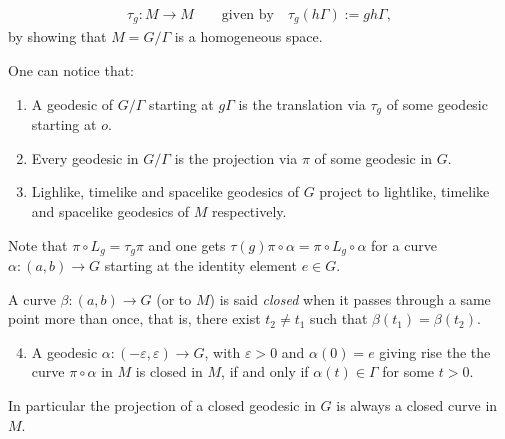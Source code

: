 \documentclass[11pt]{amsart}
\theoremstyle{plain}
\theoremstyle{definition}
\theoremstyle{remark}
\begin{document}
	\begin{eqnarray*}
		\tau_g : M \rightarrow M\qquad \mbox{given by} \quad 
		\tau_g(h\Gamma):=gh\Gamma,
	\end{eqnarray*}
	by  showing that $M=G/\Gamma$ is a homogeneous space. 
	
One can notice that: 
	
	\begin{enumerate}
		\item A geodesic of $G/\Gamma$ starting at $g\Gamma$ is the translation via $\tau_g$ of some geodesic starting at $o$. \label{punto1}
		\item Every geodesic in $G/\Gamma$ is the projection via $\pi$ of some geodesic in $G$.\label{punto2}
		\item Lighlike, timelike and spacelike geodesics of $G$ project to lightlike, timelike and spacelike geodesics of $M$ respectively.
	\end{enumerate}
	
	
	Note that $\pi \circ L_g = \tau_g \pi$ and one gets $\tau(g)\pi\circ \alpha=\pi\circ L_g \circ \alpha$ for a curve $\alpha:(a,b)\to G$ starting at the identity element  $e\in G$. 
	
	 A curve $\beta:(a,b)\to G$ (or to $M$) is said {\em closed } when it passes through a same point more than once, that is, there exist $t_2\neq  t_1$ such that $\beta(t_1)=\beta(t_2)$. %
	\begin{enumerate}
		\setcounter{enumi}{3}
		
		\item A geodesic $\alpha: (-\varepsilon, \varepsilon) \to G$, with $\varepsilon>0$ and   $\alpha(0)=e$   giving rise the the curve $\pi\circ \alpha$ in $M$  is closed in $M$, if and only if  $\alpha(t) \in \Gamma$ for some $t>0$.\label{punto4}
	\end{enumerate}
	In particular the projection of a closed geodesic in $G$ is always a closed curve in $M$.
	
\end{document}
